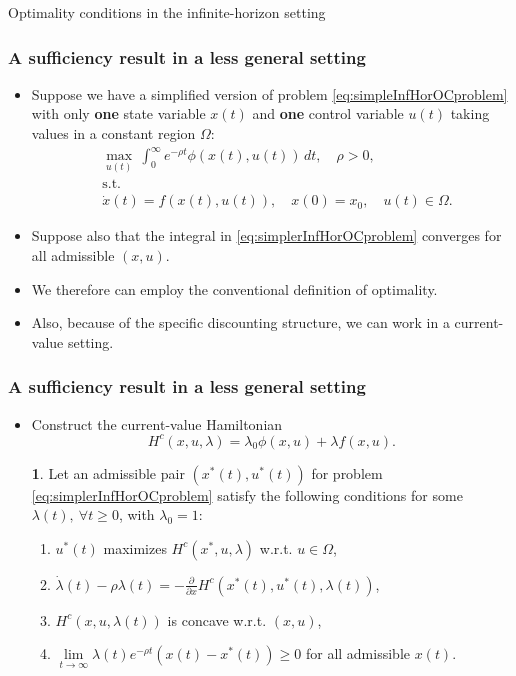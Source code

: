 \documentclass[10pt]{beamer}
\theoremstyle{definition}
\newtheorem{Fact}{\translate{Fact}}
\begin{document}
\begin{section}{Optimality conditions in the infinite-horizon setting}
\begin{frame}[fragile]
\frametitle{A sufficiency result in a less general setting}
\begin{itemize}\itemsep1em
\item Suppose we have a simplified version of problem \eqref{eq:simpleInfHorOCproblem} with only \textbf{one} state variable $ x(t) $ and \textbf{one} control variable $ u(t) $ taking values in a constant region $ \Omega $:\begin{equation}\begin{split}
&\max_{u(t)}~\int_{0}^{\infty}e^{-\rho t} \phi(x(t),u(t))\,dt, \quad \rho>0,\\
&\text{s.t.}\\
&\dot{x}(t)=f(x(t),u(t)),\quad x(0)=x_0,\quad u(t)\in \Omega.
\end{split}
\label{eq:simplerInfHorOCproblem}
\end{equation}
\item Suppose also that the integral in \eqref{eq:simplerInfHorOCproblem} converges for all admissible $ (x,u) $.
\item We therefore can employ the conventional definition of optimality.
\item Also, because of the specific discounting structure, we can work in a current-value setting.
\end{itemize}
\end{frame}

\begin{frame}[fragile]
\frametitle{A sufficiency result in a less general setting}
\begin{itemize}\itemsep1em
\item Construct the current-value Hamiltonian \[ H^c (x,u,\lambda) = \lambda_0 \phi(x,u) + \lambda f(x,u). \]

\begin{Fact}
Let an admissible pair $ (x^*(t),u^*(t)) $ for problem \eqref{eq:simplerInfHorOCproblem} satisfy the following conditions for some $ \lambda(t),~\forall t \geq 0 $, with $ \lambda_0=1 $:
\begin{enumerate}
\item $ u^*(t) $ maximizes $ H^c(x^*, u, \lambda) $ w.r.t. $ u \in \Omega $,
\item $ \dot{\lambda}(t) -\rho \lambda(t) = -\frac{\partial}{\partial x}H^c(x^*(t),u^*(t),\lambda(t)) $,
\item $ H^c(x,u,\lambda(t)) $ is concave w.r.t. $ (x,u) $,
\item $ \lim\limits_{t\rightarrow \infty} \lambda(t)e^{-\rho t}(x(t)-x^*(t)) \geq 0$ for all admissible $ x(t) $.
\end{enumerate}


\end{Fact}
\end{itemize}
\end{frame}
\end{section}
\end{document}
